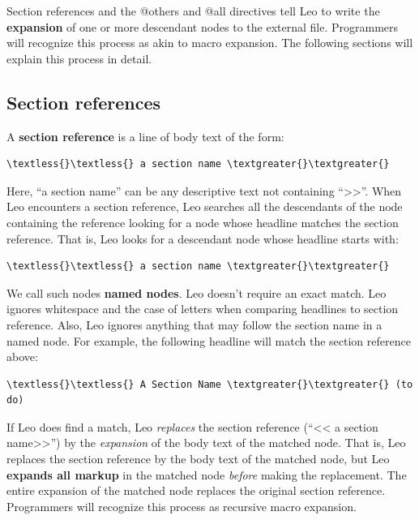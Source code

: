 \documentclass[a4paper,10pt,english]{sphinxmanual}
\begin{document}
Section references and the @others and @all directives tell Leo to write the
\textbf{expansion} of one or more descendant nodes to the external file. Programmers
will recognize this process as akin to macro expansion. The following sections
will explain this process in detail.


\subsection{Section references}
\label{intro:section-references}
A \textbf{section reference} is a line of body text of the form:

\begin{Verbatim}[commandchars=\\\{\}]
\textless{}\textless{} a section name \textgreater{}\textgreater{}
\end{Verbatim}

Here, ``a section name'' can be any descriptive text not containing ``\textgreater{}\textgreater{}''. When Leo
encounters a section reference, Leo searches all the descendants of the node
containing the reference looking for a node whose headline matches the section
reference. That is, Leo looks for a descendant node whose headline starts with:

\begin{Verbatim}[commandchars=\\\{\}]
\textless{}\textless{} a section name \textgreater{}\textgreater{}
\end{Verbatim}

We call such nodes \textbf{named nodes}. Leo doesn't require an exact match. Leo
ignores whitespace and the case of letters when comparing headlines to section
reference. Also, Leo ignores anything that may follow the section name in a
named node. For example, the following headline will match the section reference
above:

\begin{Verbatim}[commandchars=\\\{\}]
\textless{}\textless{} A Section Name \textgreater{}\textgreater{} (to do)
\end{Verbatim}

If Leo does find a match, Leo \emph{replaces} the section reference (``\textless{}\textless{} a section
name\textgreater{}\textgreater{}'') by the \emph{expansion} of the body text of the matched node. That is, Leo
replaces the section reference by the body text of the matched node, but Leo
\textbf{expands all markup} in the matched node \emph{before} making the replacement. The
entire expansion of the matched node replaces the original section reference.
Programmers will recognize this process as recursive macro expansion.
\end{document}
